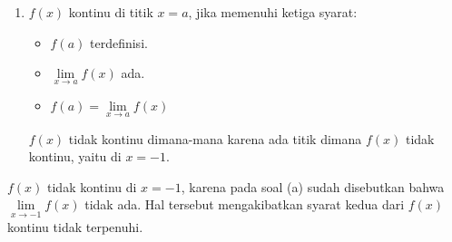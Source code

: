 \documentclass[10pt,openany,a4paper]{article}
\begin{document}
\begin{enumerate}
\begin{enumerate}
            \item $f(x)$ kontinu di titik $x=a$, jika memenuhi ketiga syarat:
            \begin{itemize}
                \item $f(a)$ terdefinisi.
                \item $\lim\limits_{x\to a}f(x)$ ada.
                \item $f(a)=\lim\limits_{x\to a}f(x)$
            \end{itemize}
            $f(x)$ tidak kontinu dimana-mana karena ada titik dimana $f(x)$ tidak kontinu, yaitu di $x=-1$. 
        \end{enumerate}
        $f(x)$ tidak kontinu di $x=-1$, karena pada soal (a) sudah disebutkan bahwa $\lim\limits_{x\to-1}f(x)$ tidak ada. Hal tersebut mengakibatkan syarat kedua dari $f(x)$ kontinu tidak terpenuhi.\\~\\
        

\end{enumerate}
\end{document}
